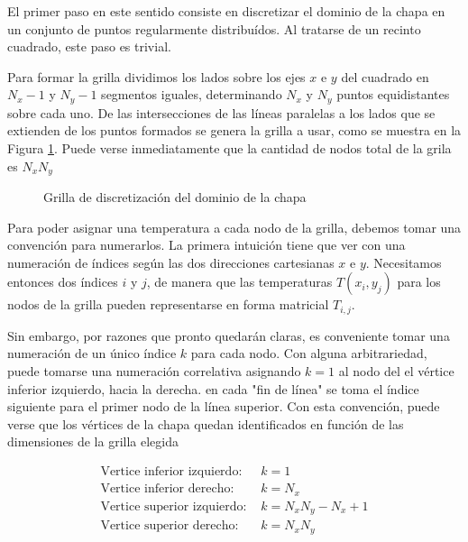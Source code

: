 
El primer paso en este sentido consiste en discretizar 
el dominio de la chapa en un conjunto de puntos regularmente 
distribuídos. Al tratarse de un recinto cuadrado, este paso es trivial.

Para formar la grilla dividimos los lados sobre 
los ejes $x$ e $y$ del cuadrado en $N_x-1$ y $N_y-1$
segmentos iguales, determinando $N_x$ y $N_y$ puntos
equidistantes sobre cada uno. De las intersecciones
de las líneas paralelas a los lados que se 
extienden de los puntos formados se genera la grilla 
a usar, como se muestra en la Figura \ref{FiguraDiscretizacion}.
Puede verse inmediatamente que la cantidad de nodos
total de la grila es $N_x N_y$

\begin{figure}
  \caption{Grilla de discretización del dominio de la chapa\label{FiguraDiscretizacion}}
\end{figure}

Para poder asignar una temperatura a cada nodo de la grilla, 
debemos tomar una convención para numerarlos. La primera
intuición tiene que ver con una numeración de índices según 
las dos direcciones cartesianas $x$ e $y$. Necesitamos 
entonces dos índices $i$ y $j$, de manera que las 
temperaturas $T(x_i,y_j)$ para los nodos de la grilla
pueden representarse en forma matricial $T_{i,j}$.

Sin embargo, por razones que pronto quedarán claras, es 
conveniente tomar una numeración de un único índice $k$
para cada nodo.  
Con alguna arbitrariedad, puede tomarse una numeración
correlativa asignando $k=1$ al nodo del 
el vértice inferior izquierdo, hacia la 
derecha. en cada "fin de línea" se toma el índice 
siguiente para el primer nodo de la línea superior. 
Con esta convención, puede verse que los vértices 
de la chapa quedan identificados en función de las dimensiones
de la grilla elegida

\begin{equation}
  \begin{split}
    \text{Vertice inferior izquierdo:   } & k=1\\
    \text{Vertice inferior derecho:     } & k=N_x \\
    \text{Vertice superior izquierdo:   } & k=N_xN_y-N_x+1\\
    \text{Vertice superior derecho:     } & k=N_xN_y
  \end{split}
  \label{EqEcuacionesNumeracionVerticies}
\end{equation}

